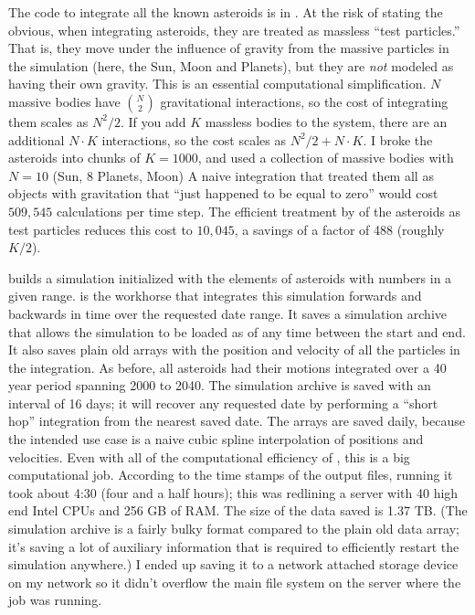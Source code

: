 The code to integrate all the known asteroids is in .
At the risk of stating the obvious, when integrating asteroids, they are treated as massless ``test particles.''
That is, they move under the influence of gravity from the massive particles in the simulation (here, the Sun, Moon and Planets),
but they are \textit{not} modeled as having their own gravity.
This is an essential computational simplification.
$N$ massive bodies have ${N}\choose{2}$ gravitational interactions, so the cost of integrating them scales as $N^2 / 2$.
If you add $K$ massless bodies to the system, there are an additional $N\cdot K$ interactions, so the cost scales as $N^2 / 2 + N \cdot K$.
I broke the asteroids into chunks of $K=1000$, and used a collection of massive bodies with $N=10$ (Sun, 8 Planets, Moon)
A naive integration that treated them all as objects with gravitation that ``just happened to be equal to zero'' would cost $509,545$ calculations per time step.
The efficient treatment by  of the asteroids as test particles reduces this cost to $10,045$, a savings of a factor of 488 (roughly $K/2$).

 builds a  simulation initialized with the elements of asteroids with numbers in a given range.
 is the workhorse that integrates this simulation forwards and backwards in time over the requested date range.
It saves a  simulation archive that allows the simulation to be loaded as of any time between the start and end.
It also saves plain old  arrays with the position and velocity of all the particles in the integration.
As before, all asteroids had their motions integrated over a 40 year period spanning 2000 to 2040.
The simulation archive is saved with an interval of 16 days; it will recover any requested date by performing 
a ``short hop'' integration from the nearest saved date.
The  arrays are saved daily, because the intended use case is a naive cubic spline interpolation of positions and velocities.
Even with all of the computational efficiency of , this is a big computational job.
According to the time stamps of the output files, running it took about 4:30 (four and a half hours); 
this was redlining a server with 40 high end Intel CPUs and 256 GB of RAM.
The size of the data saved is 1.37 TB.  
(The  simulation archive is a fairly bulky format compared to the plain old data array; 
it's saving a lot of auxiliary information that is required to efficiently restart the simulation anywhere.)
I ended up saving it to a network attached storage device on my network so it didn't overflow the main file system on the server where the job was running.

